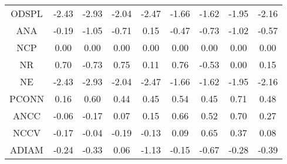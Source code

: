 \documentclass[11pt,a4paper]{report}
\begin{document}
\begin{longtable}{ | c || c | c | c | c | c | c | c || c |}
ODSPL &  \cellcolor[HTML]{FFBFBF} -2.43 &  \cellcolor[HTML]{FFB7B7} -2.93 &  \cellcolor[HTML]{FFCFCF} -2.04 &  \cellcolor[HTML]{FFBFBF} -2.47 &  \cellcolor[HTML]{FFD7D7} -1.66 &  \cellcolor[HTML]{FFD7D7} -1.62 &  \cellcolor[HTML]{FFCFCF} -1.95 &  \cellcolor[HTML]{FFC7C7} -2.16 \\
ANA &  \cellcolor[HTML]{FFF7F7} -0.19 &  \cellcolor[HTML]{FFE7E7} -1.05 &  \cellcolor[HTML]{FFEFEF} -0.71 &  \cellcolor[HTML]{FFFFFF} 0.15 &  \cellcolor[HTML]{FFF7F7} -0.47 &  \cellcolor[HTML]{FFEFEF} -0.73 &  \cellcolor[HTML]{FFE7E7} -1.02 &  \cellcolor[HTML]{FFEFEF} -0.57 \\
NCP &  \cellcolor[HTML]{FFFFFF} 0.00 &  \cellcolor[HTML]{FFFFFF} 0.00 &  \cellcolor[HTML]{FFFFFF} 0.00 &  \cellcolor[HTML]{FFFFFF} 0.00 &  \cellcolor[HTML]{FFFFFF} 0.00 &  \cellcolor[HTML]{FFFFFF} 0.00 &  \cellcolor[HTML]{FFFFFF} 0.00 &  \cellcolor[HTML]{FFFFFF} 0.00 \\
NR &  \cellcolor[HTML]{EFEFFF} 0.70 &  \cellcolor[HTML]{FFEFEF} -0.73 &  \cellcolor[HTML]{EFEFFF} 0.75 &  \cellcolor[HTML]{FFFFFF} 0.11 &  \cellcolor[HTML]{EFEFFF} 0.76 &  \cellcolor[HTML]{FFEFEF} -0.53 &  \cellcolor[HTML]{FFFFFF} 0.00 &  \cellcolor[HTML]{FFFFFF} 0.15 \\
NE &  \cellcolor[HTML]{FFBFBF} -2.43 &  \cellcolor[HTML]{FFB7B7} -2.93 &  \cellcolor[HTML]{FFCFCF} -2.04 &  \cellcolor[HTML]{FFBFBF} -2.47 &  \cellcolor[HTML]{FFD7D7} -1.66 &  \cellcolor[HTML]{FFD7D7} -1.62 &  \cellcolor[HTML]{FFCFCF} -1.95 &  \cellcolor[HTML]{FFC7C7} -2.16 \\
PCONN &  \cellcolor[HTML]{F7F7FF} 0.16 &  \cellcolor[HTML]{EFEFFF} 0.60 &  \cellcolor[HTML]{F7F7FF} 0.44 &  \cellcolor[HTML]{F7F7FF} 0.45 &  \cellcolor[HTML]{EFEFFF} 0.54 &  \cellcolor[HTML]{F7F7FF} 0.45 &  \cellcolor[HTML]{EFEFFF} 0.71 &  \cellcolor[HTML]{EFEFFF} 0.48 \\
ANCC &  \cellcolor[HTML]{FFFFFF} -0.06 &  \cellcolor[HTML]{FFF7F7} -0.17 &  \cellcolor[HTML]{FFFFFF} 0.07 &  \cellcolor[HTML]{FFFFFF} 0.15 &  \cellcolor[HTML]{EFEFFF} 0.66 &  \cellcolor[HTML]{EFEFFF} 0.52 &  \cellcolor[HTML]{EFEFFF} 0.70 &  \cellcolor[HTML]{F7F7FF} 0.27 \\
NCCV &  \cellcolor[HTML]{FFF7F7} -0.17 &  \cellcolor[HTML]{FFFFFF} -0.04 &  \cellcolor[HTML]{FFF7F7} -0.19 &  \cellcolor[HTML]{FFFFFF} -0.13 &  \cellcolor[HTML]{FFFFFF} 0.09 &  \cellcolor[HTML]{EFEFFF} 0.65 &  \cellcolor[HTML]{F7F7FF} 0.37 &  \cellcolor[HTML]{FFFFFF} 0.08 \\
ADIAM &  \cellcolor[HTML]{FFF7F7} -0.24 &  \cellcolor[HTML]{FFF7F7} -0.33 &  \cellcolor[HTML]{FFFFFF} 0.06 &  \cellcolor[HTML]{FFDFDF} -1.13 &  \cellcolor[HTML]{FFFFFF} -0.15 &  \cellcolor[HTML]{FFEFEF} -0.67 &  \cellcolor[HTML]{FFF7F7} -0.28 &  \cellcolor[HTML]{FFF7F7} -0.39 \\

\end{longtable}
\end{document}
